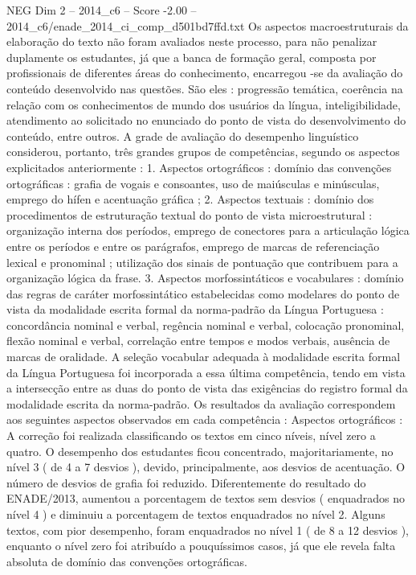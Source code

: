 \begin{textsample}{NEG Dim 2 – 2014\_c6 – Score -2.00 – 2014\_c6/enade\_2014\_ci\_comp\_d501bd7ffd.txt}
Os aspectos macroestruturais da elaboração do texto não foram avaliados neste processo, para não penalizar duplamente os estudantes, já que a banca de formação geral, composta por profissionais de diferentes áreas do conhecimento, encarregou -se da avaliação do conteúdo desenvolvido nas questões.
São eles : progressão temática, coerência na relação com os conhecimentos de mundo dos usuários da língua, inteligibilidade, atendimento ao solicitado no enunciado do ponto de vista do desenvolvimento do conteúdo, entre outros.
A grade de avaliação do desempenho linguístico considerou, portanto, três grandes grupos de competências, segundo os aspectos explicitados anteriormente : 1.
Aspectos ortográficos : domínio das convenções ortográficas : grafia de vogais e consoantes, uso de maiúsculas e minúsculas, emprego do hífen e acentuação gráfica ; 2.
Aspectos textuais : domínio dos procedimentos de estruturação textual do ponto de vista microestrutural : organização interna dos períodos, emprego de conectores para a articulação lógica entre os períodos e entre os parágrafos, emprego de marcas de referenciação lexical e pronominal ; utilização dos sinais de pontuação que contribuem para a organização lógica da frase. 3.
Aspectos morfossintáticos e vocabulares : domínio das regras de caráter morfossintático estabelecidas como modelares do ponto de vista da modalidade escrita formal da norma-padrão da Língua Portuguesa : concordância nominal e verbal, regência nominal e verbal, colocação pronominal, flexão nominal e verbal, correlação entre tempos e modos verbais, ausência de marcas de oralidade.
A seleção vocabular adequada à modalidade escrita formal da Língua Portuguesa foi incorporada a essa última competência, tendo em vista a intersecção entre as duas do ponto de vista das exigências do registro formal da modalidade escrita da norma-padrão.
Os resultados da avaliação correspondem aos seguintes aspectos observados em cada competência : Aspectos ortográficos : A correção foi realizada classificando os textos em cinco níveis, nível zero a quatro.
O desempenho dos estudantes ficou concentrado, majoritariamente, no nível 3 ( de 4 a 7 desvios ), devido, principalmente, aos desvios de acentuação.
O número de desvios de grafia foi reduzido.
Diferentemente do resultado do ENADE/2013, aumentou a porcentagem de textos sem desvios ( enquadrados no nível 4 ) e diminuiu a porcentagem de textos enquadrados no nível 2.
Alguns textos, com pior desempenho, foram enquadrados no nível 1 ( de 8 a 12 desvios ), enquanto o nível zero foi atribuído a pouquíssimos casos, já que ele revela falta absoluta de domínio das convenções ortográficas.

\end{textsample}
